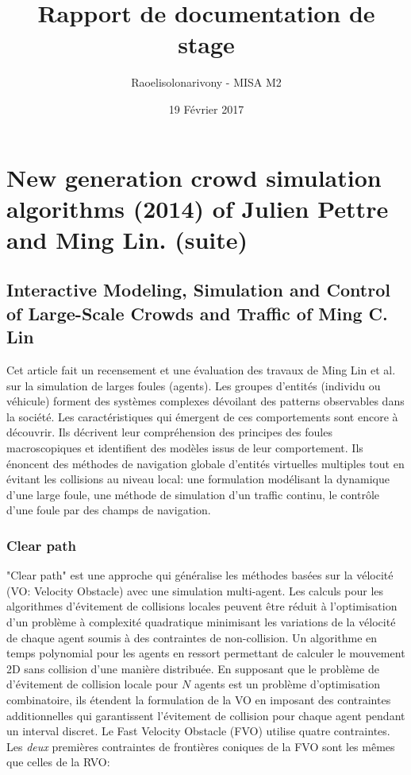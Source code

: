\documentclass[11pt]{article}
\title{Rapport de documentation de stage}
\author{Raoelisolonarivony - MISA M2}
\date{19 Février 2017}
\begin{document}
\maketitle

\tableofcontents

\newpage

\section{New generation crowd simulation algorithms (2014) of Julien Pettre and Ming Lin. (suite)}

\subsection{Interactive Modeling, Simulation and Control of Large-Scale Crowds and Traffic of Ming C. Lin}
 

Cet article fait un recensement et une évaluation des travaux de Ming Lin et al. sur la simulation de larges foules (agents).
Les groupes d'entités (individu ou véhicule) forment des systèmes complexes dévoilant des patterns observables dans la société.
Les caractéristiques qui émergent de ces comportements sont encore à découvrir.
Ils décrivent leur compréhension des principes des foules macroscopiques et identifient des modèles issus de leur comportement.
Ils énoncent des méthodes de navigation globale d'entités virtuelles multiples tout en évitant les collisions au niveau local: une formulation modélisant la dynamique d'une large foule, une méthode de simulation d'un traffic continu, le contrôle d'une foule par des champs de navigation.

\subsubsection{Clear path}

"Clear path" est une approche qui généralise les méthodes basées sur la vélocité (VO: Velocity Obstacle) avec une simulation multi-agent. Les calculs pour les algorithmes d'évitement de collisions locales peuvent être réduit à l'optimisation d'un problème à complexité quadratique minimisant les variations de la vélocité de chaque agent soumis à des contraintes de non-collision. Un algorithme en temps polynomial pour les agents en ressort permettant de calculer le mouvement 2D sans collision d'une manière distribuée. En supposant que le problème de d'évitement de collision locale pour $N$ agents est un problème d'optimisation combinatoire, ils étendent la formulation de la VO en imposant des contraintes additionnelles qui garantissent l'évitement de collision pour chaque agent pendant un interval discret. Le Fast Velocity Obstacle (FVO) utilise quatre contraintes. Les \textit{deux} premières contraintes de frontières coniques de la FVO sont les mêmes que celles de la RVO:
\end{document}
